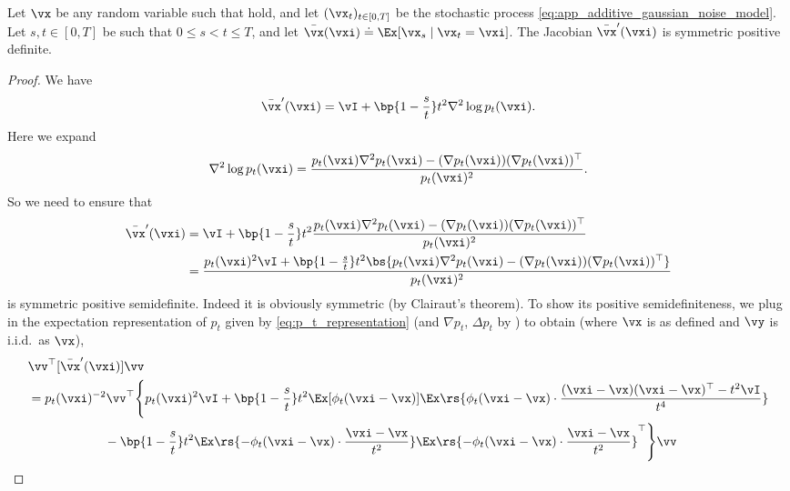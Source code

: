 \documentclass[../../book-main.tex]{subfiles}
\begin{document}
\begin{lemma}\label{lem:gribonval_A1}
    Let \(\vx\) be any random variable such that  hold, and let \((\vx_{t})_{t \in [0, T]}\) be the stochastic process \eqref{eq:app_additive_gaussian_noise_model}. Let \(s, t \in [0, T]\) be such that \(0 \leq s < t \leq T\), and let \(\bar{\vx}(\vxi) \doteq \Ex[\vx_{s} \mid \vx_{t} = \vxi]\). The Jacobian \(\bar{\vx}^{\prime}(\vxi)\) is symmetric positive definite.
\end{lemma}
\begin{proof}
    We have 
    \begin{equation}
        \bar{\vx}^{\prime}(\vxi) = \vI + \bp{1 - \frac{s}{t}}t^{2}\nabla^{2}\log p_{t}(\vxi).
    \end{equation}
    Here we expand 
    \begin{equation}
        \nabla^{2}\log p_{t}(\vxi) = \frac{p_{t}(\vxi)\nabla^{2}p_{t}(\vxi) - (\nabla p_{t}(\vxi))(\nabla p_{t}(\vxi))^{\top}}{p_{t}(\vxi)^{2}}.
    \end{equation}
    So we need to ensure that 
    \begin{align}
        \bar{\vx}^{\prime}(\vxi)
        &= \vI + \bp{1 - \frac{s}{t}}t^{2}\frac{p_{t}(\vxi)\nabla^{2}p_{t}(\vxi) - (\nabla p_{t}(\vxi))(\nabla p_{t}(\vxi))^{\top}}{p_{t}(\vxi)^{2}} \\
        &= \frac{p_{t}(\vxi)^{2}\vI + \bp{1 - \frac{s}{t}}t^{2}\bs{p_{t}(\vxi)\nabla^{2}p_{t}(\vxi) - (\nabla p_{t}(\vxi))(\nabla p_{t}(\vxi))^{\top}}}{p_{t}(\vxi)^{2}}
    \end{align}
    is symmetric positive semidefinite. Indeed it is obviously symmetric (by Clairaut's theorem). To show its positive semidefiniteness, we plug in the expectation representation of \(p_{t}\) given by \eqref{eq:p_t_representation} (and \(\nabla p_{t}\), \(\Delta p_{t}\) by ) to obtain (where \(\vx\) is as defined and \(\vy\) is i.i.d.~as \(\vx\)),
    \begin{align}
        &\vv^{\top}[\bar{\vx}^{\prime}(\vxi)]\vv \\
        &= p_{t}(\vxi)^{-2}\vv^{\top}\Bigg\{p_{t}(\vxi)^{2}\vI + \bp{1 - \frac{s}{t}}t^{2}\Ex[\phi_{t}(\vxi - \vx)]\Ex\rs{\phi_{t}(\vxi - \vx)\cdot\frac{(\vxi - \vx)(\vxi - \vx)^{\top} - t^{2}\vI}{t^{4}}} \\
        & \qquad \qquad \qquad -\bp{1 - \frac{s}{t}}t^{2}\Ex\rs{-\phi_{t}(\vxi - \vx)\cdot\frac{\vxi - \vx}{t^{2}}}\Ex\rs{-\phi_{t}(\vxi - \vx)\cdot\frac{\vxi - \vx}{t^{2}}}^{\top}\Bigg\}\vv \\

\end{align}
\end{proof}
\end{document}
